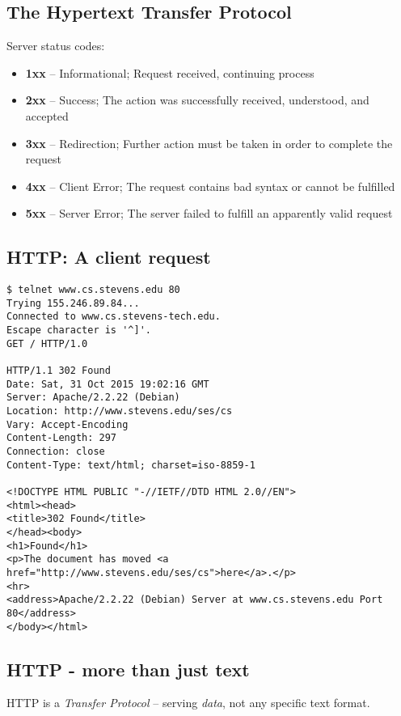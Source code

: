 \documentclass[xga]{xdvislides}
\begin{document}
\subsection{The Hypertext Transfer Protocol}
Server status codes:
\begin{itemize}
	\item {\bf 1xx} -- Informational; Request received, continuing process
	\item {\bf 2xx} -- Success; The action was successfully received,
        understood, and accepted
	\item {\bf 3xx} -- Redirection; Further action must be taken in order to
        complete the request
	\item {\bf 4xx} -- Client Error; The request contains bad syntax or
		cannot be fulfilled
	\item {\bf 5xx} -- Server Error; The server failed to fulfill an
		apparently valid request
\end{itemize}

\subsection{HTTP: A client request}
\newcommand{\smallish}{\fontsize{16}{16}\selectfont}
\smallish
\begin{center}
\begin{verbatim}
$ telnet www.cs.stevens.edu 80
Trying 155.246.89.84...
Connected to www.cs.stevens-tech.edu.
Escape character is '^]'.
GET / HTTP/1.0

HTTP/1.1 302 Found
Date: Sat, 31 Oct 2015 19:02:16 GMT
Server: Apache/2.2.22 (Debian)
Location: http://www.stevens.edu/ses/cs
Vary: Accept-Encoding
Content-Length: 297
Connection: close
Content-Type: text/html; charset=iso-8859-1

<!DOCTYPE HTML PUBLIC "-//IETF//DTD HTML 2.0//EN">
<html><head>
<title>302 Found</title>
</head><body>
<h1>Found</h1>
<p>The document has moved <a href="http://www.stevens.edu/ses/cs">here</a>.</p>
<hr>
<address>Apache/2.2.22 (Debian) Server at www.cs.stevens.edu Port 80</address>
</body></html>
\end{verbatim}
\end{center}
\Normalsize

\subsection{HTTP - more than just text}
HTTP is a {\em Transfer Protocol} -- serving {\em data}, not any specific
text format.
\end{document}
